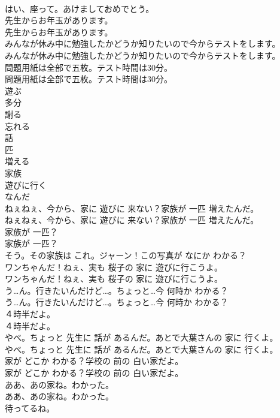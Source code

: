 \documentclass[8pt]{extreport}
\begin{document}
\begin{CJK}{UTF8}{min}
\\	はい、座って。あけましておめでとう。 
\\	先生からお年玉があります。	
\\	先生からお年玉があります。 
\\	みんなが休み中に勉強したかどうか知りたいので今からテストをします。	
\\	みんなが休み中に勉強したかどうか知りたいので今からテストをします。 
\\	問題用紙は全部で五枚。テスト時間は30分。	
\\	問題用紙は全部で五枚。テスト時間は30分。 
\\	遊ぶ
\\	多分
\\	謝る
\\	忘れる
\\	話
\\	匹
\\	増える
\\	家族
\\	遊びに行く
\\	なんだ
\\	ねぇねぇ、今から、家に 遊びに 来ない？家族が 一匹 増えたんだ。	
\\	ねぇねぇ、今から、家に 遊びに 来ない？家族が 一匹 増えたんだ。 
\\	家族が 一匹？	
\\	家族が 一匹？ 
\\	そう。その家族は これ。ジャーン！この写真が なにか わかる？ 
\\	ワンちゃんだ！ねぇ、実も 桜子の 家に 遊びに行こうよ。	
\\	ワンちゃんだ！ねぇ、実も 桜子の 家に 遊びに行こうよ。 
\\	う…ん。行きたいんだけど…。ちょっと…今 何時か わかる？	
\\	う…ん。行きたいんだけど…。ちょっと…今 何時か わかる？ 
\\	４時半だよ。	
\\	４時半だよ。 
\\	やべ。ちょっと 先生に 話が あるんだ。あとで大葉さんの 家に 行くよ。	
\\	やべ。ちょっと 先生に 話が あるんだ。あとで大葉さんの 家に 行くよ。 
\\	家が どこか わかる？学校の 前の 白い家だよ。	
\\	家が どこか わかる？学校の 前の 白い家だよ。 
\\	ああ、あの家ね。わかった。	
\\	ああ、あの家ね。わかった。 
\\	待ってるね。	

\end{CJK}
\end{document}

